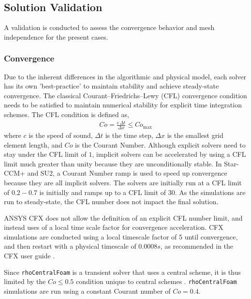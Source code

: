\documentclass[journal ]{new-aiaa}
\begin{document}
\subsection{Solution Validation}
A validation is conducted to assess the convergence behavior and mesh independence for the present cases.

\subsubsection{Convergence}
Due to the inherent differences in the algorithmic and physical model, each solver has its own 'best-practice' to maintain stability and achieve steady-state convergence. The classical Courant–Friedrichs–Lewy (CFL) convergence condition needs to be satisfied to maintain numerical stability for explicit time integration schemes. The CFL condition is defined as,
\begin{align}
    Co={\frac  {c\,\Delta t}{\Delta x}}\leq Co_{\max }
\end{align}
where $c$ is the speed of sound, $\Delta t$ is the time step, $\Delta x$ is the smallest grid element length, and $Co$ is the Courant Number. Although explicit solvers need to stay under the CFL limit of $1$, implicit solvers can be accelerated by using a CFL limit much greater than unity because they are unconditionally stable. In Star-CCM+ and SU2, a Courant Number ramp is used to speed up convergence because they are all implicit solvers. The solvers are initially run at a CFL limit of $0.2 - 0.7$ is initially and ramps up to a CFL limit of $30$. As the simulations are run to steady-state, the CFL number does not impact the final solution.

ANSYS CFX does not allow the definition of an explicit CFL number limit, and instead uses of a local time scale factor for convergence acceleration. CFX simulations are conducted using a local timescale factor of 5 until convergence, and then restart with a physical timescale of $0.0008s$, as recommended in the CFX user guide \cite{Ansys_userguide}. 

Since \texttt{rhoCentralFoam} is a transient solver that uses a central scheme, it is thus limited by the $Co \leq 0.5$ condition unique to central schemes \cite{Greenshields2010}. \texttt{rhoCentralFoam} simulations are run using a constant Courant number of $Co = 0.4$. 
\end{document}
